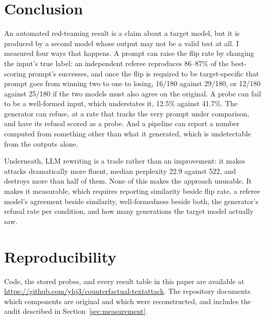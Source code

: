 \documentclass[11pt]{article}
\begin{document}
\section{Conclusion}

An automated red-teaming result is a claim about a target model, but it is
produced by a second model whose output may not be a valid test at all. I
measured four ways that happens. A prompt can raise the flip rate by changing the
input's true label: an independent referee reproduces 86--87\% of the
best-scoring prompt's successes, and once the flip is required to be
target-specific that prompt goes from winning two to one to losing, 16/180 against
29/180, or 12/180 against 25/180 if the two models must also agree on the original. A probe can fail to be a well-formed input,
which understates it, 12.5\% against 41.7\%. The generator can refuse, at a rate
that tracks the very prompt under comparison, and have its refusal scored as a
probe. And a pipeline can report a number computed from something other than what
it generated, which is undetectable from the outputs alone.

Underneath, LLM rewriting is a trade rather than an improvement: it makes attacks
dramatically more fluent, median perplexity 22.9 against 522, and destroys more
than half of them. None of this makes the approach unusable. It makes it
measurable, which requires reporting similarity beside flip rate, a referee model's
agreement beside similarity, well-formedness beside both, the generator's refusal
rate per condition, and how many generations the target model actually saw.

\section*{Reproducibility}

Code, the stored probes, and every result table in this paper are available at
\url{https://github.com/yhj3/counterfactual-textattack}. The repository documents
which components are original and which were reconstructed, and includes the
audit described in Section~\ref{sec:measurement}.
\end{document}
